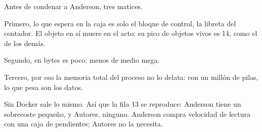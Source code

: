 Antes de condenar a Anderson, tres matices.

Primero, lo que espera en la caja es solo el bloque de control, la libreta del contador. El objeto en sí muere en el acto: su pico de objetos vivos es 14, como el de los demás.

Segundo, en bytes es poco: menos de medio mega.

Tercero, por eso la memoria total del proceso no lo delata: con un millón de pilas, lo que pesa son los datos.

Sin Docker sale lo mismo. Así que la fila 13 se reproduce: Anderson tiene un sobrecoste pequeño, y Autores, ninguno. Anderson compra velocidad de lectura con una caja de pendientes; Autores no la necesita.
